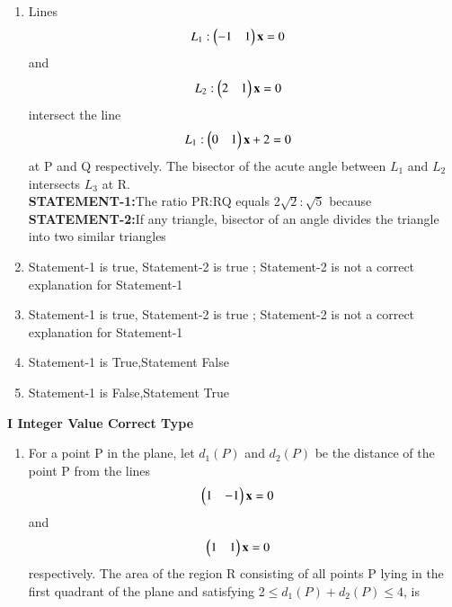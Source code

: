 \begin{enumerate}
    \item Lines \begin{align}L_1: \begin{pmatrix}-1 & 1\end{pmatrix} \mathbf {x} &=0\end{align} and \begin{align}L_2: \begin{pmatrix}2 & 1\end{pmatrix} \mathbf {x} &=0\end{align} intersect the line \begin{align}L_1: \begin{pmatrix}0 & 1\end{pmatrix} \mathbf {x} + 2 &=0\end{align} at P and Q respectively. The bisector of the acute angle between $L_1$ and $L_2$ intersects $L_3$ at R.\\
     {\textbf{STATEMENT-1:}}The ratio PR:RQ equals 2$\sqrt2:\sqrt5$ because\\
    
     {\textbf{STATEMENT-2:}}If any triangle, bisector of an angle divides the triangle into two similar triangles
     \item  Statement-1 is true, Statement-2 is true ; Statement-2 is not a correct explanation for Statement-1
     \item  Statement-1 is true, Statement-2 is true ;  Statement-2 is not a correct explanation for Statement-1
     \item  Statement-1 is True,Statement False
     \item  Statement-1 is False,Statement True\\
\end{enumerate}
{\Large \textbf{I Integer Value Correct Type}}
\begin{enumerate}


\item For a point P in the plane, let $d_1(P)$ and $d_2(P)$ be the distance of the point P from the lines \begin{align} \begin{pmatrix}1 & -1\end{pmatrix} \mathbf {x} &=0\end{align} and \begin{align} \begin{pmatrix}1 & 1\end{pmatrix} \mathbf {x} &=0\end{align} respectively. The area of the region R consisting of all points P lying in the first quadrant of the plane and satisfying 2$\leq d_1(P)+d_2(P) \leq 4$, is
\end{enumerate}
